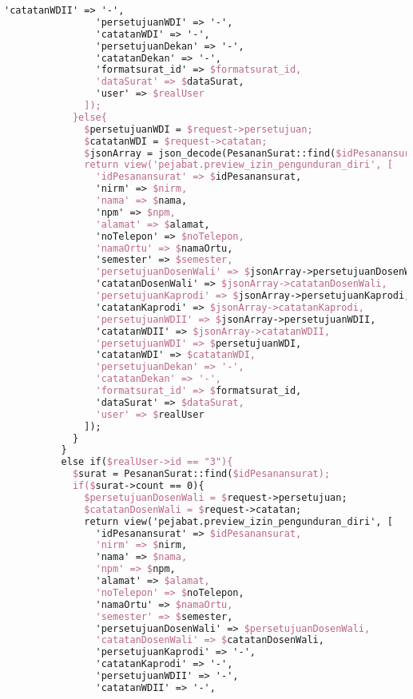 \begin{lstlisting}[language=tex,basicstyle=\tiny,caption=PesanansuratController.php]
                'catatanWDII' => '-',
                'persetujuanWDI' => '-',
                'catatanWDI' => '-',
                'persetujuanDekan' => '-',
                'catatanDekan' => '-',
                'formatsurat_id' => $formatsurat_id,
                'dataSurat' => $dataSurat,
                'user' => $realUser
              ]);
            }else{
              $persetujuanWDI = $request->persetujuan;
              $catatanWDI = $request->catatan;
              $jsonArray = json_decode(PesananSurat::find($idPesanansurat)->dataSurat);
              return view('pejabat.preview_izin_pengunduran_diri', [
                'idPesanansurat' => $idPesanansurat,
                'nirm' => $nirm,
                'nama' => $nama,
                'npm' => $npm,
                'alamat' => $alamat,
                'noTelepon' => $noTelepon,
                'namaOrtu' => $namaOrtu,
                'semester' => $semester,
                'persetujuanDosenWali' => $jsonArray->persetujuanDosenWali,
                'catatanDosenWali' => $jsonArray->catatanDosenWali,
                'persetujuanKaprodi' => $jsonArray->persetujuanKaprodi,
                'catatanKaprodi' => $jsonArray->catatanKaprodi,
                'persetujuanWDII' => $jsonArray->persetujuanWDII,
                'catatanWDII' => $jsonArray->catatanWDII,
                'persetujuanWDI' => $persetujuanWDI,
                'catatanWDI' => $catatanWDI,
                'persetujuanDekan' => '-',
                'catatanDekan' => '-',
                'formatsurat_id' => $formatsurat_id,
                'dataSurat' => $dataSurat,
                'user' => $realUser
              ]);
            }
          }
          else if($realUser->id == "3"){
            $surat = PesananSurat::find($idPesanansurat);
            if($surat->count == 0){
              $persetujuanDosenWali = $request->persetujuan;
              $catatanDosenWali = $request->catatan;
              return view('pejabat.preview_izin_pengunduran_diri', [
                'idPesanansurat' => $idPesanansurat,
                'nirm' => $nirm,
                'nama' => $nama,
                'npm' => $npm,
                'alamat' => $alamat,
                'noTelepon' => $noTelepon,
                'namaOrtu' => $namaOrtu,
                'semester' => $semester,
                'persetujuanDosenWali' => $persetujuanDosenWali,
                'catatanDosenWali' => $catatanDosenWali,
                'persetujuanKaprodi' => '-',
                'catatanKaprodi' => '-',
                'persetujuanWDII' => '-',
                'catatanWDII' => '-',

\end{lstlisting}
